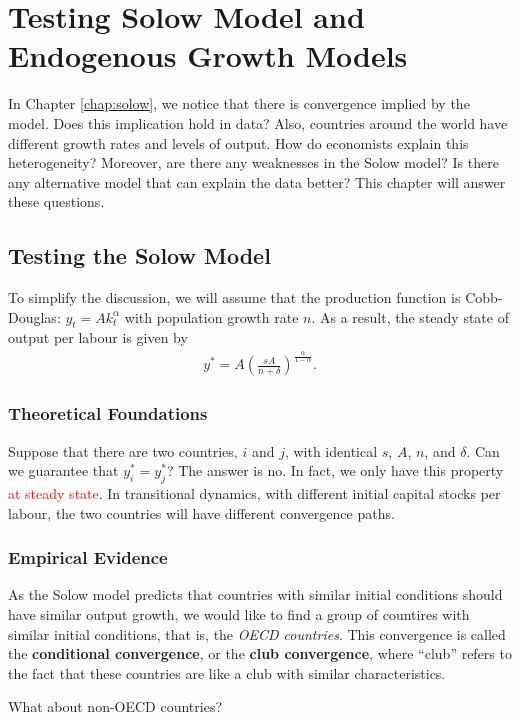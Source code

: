 \documentclass{book}
\theoremstyle{definition}
\theoremstyle{plain}
\begin{document}

\chapter{Testing Solow Model and Endogenous Growth Models}\label{chap:testing_solow_and_endogenous_growth}

In Chapter \ref{chap:solow}, we notice that there is convergence implied by the model. Does this implication hold in data? Also, countries around the world have different growth rates and levels of output. How do economists explain this heterogeneity? Moreover, are there any weaknesses in the Solow model? Is there any alternative model that can explain the data better? This chapter will answer these questions.

\section{Testing the Solow Model}
To simplify the discussion, we will assume that the production function is Cobb-Douglas: $y_t = A k_t^{\alpha}$ with population growth rate $n$. As a result, the steady state of output per labour is given by
\begin{align*}
    y^* = A \left(\frac{sA}{n+\delta}\right)^{\frac{\alpha}{1-\alpha}}.
\end{align*}
\subsection{Theoretical Foundations}
Suppose that there are two countries, $i$ and $j$, with identical $s$, $A$, $n$, and $\delta$. Can we guarantee that $y_i^* = y_j^*$? The answer is no. In fact, we only have this property \textcolor{red}{at steady state}. In transitional dynamics, with different initial capital stocks per labour, the two countries will have different convergence paths. 


\subsection{Empirical Evidence}
As the Solow model predicts that countries with similar initial conditions should have similar output growth, we would like to find a group of countires with similar initial conditions, that is, the \textit{OECD countries}. This convergence is called the \textbf{conditional convergence}, or the \textbf{club convergence}, where ``club'' refers to the fact that these countries are like a club with similar characteristics.


What about non-OECD countries? 





\end{document}
